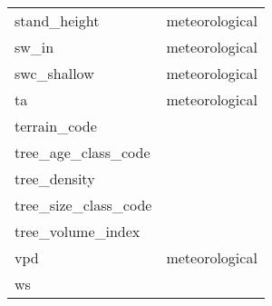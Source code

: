 \begin{tabular}{ll}
stand\_height & meteorological \\ 
sw\_in & meteorological \\ 
swc\_shallow & meteorological \\ 
ta & meteorological \\ 
terrain\_code &  \\ 
tree\_age\_class\_code &  \\ 
tree\_density &  \\ 
tree\_size\_class\_code &  \\ 
tree\_volume\_index &  \\ 
vpd & meteorological \\ 
ws &  \\ 
\hline
\end{tabular}
